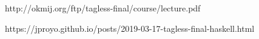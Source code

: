 http://okmij.org/ftp/tagless-final/course/lecture.pdf

https://jproyo.github.io/posts/2019-03-17-tagless-final-haskell.html